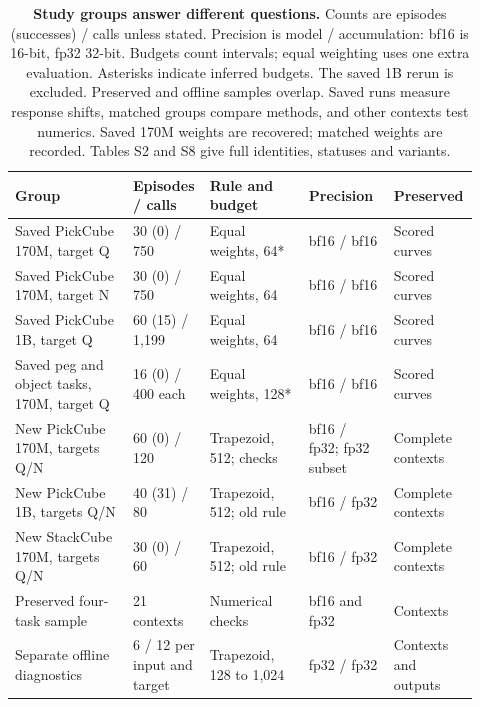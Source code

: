 \begin{table}[htbp]
\centering
\caption{\textbf{Study groups answer different questions.} Counts are episodes (successes) / calls unless stated. Precision is model / accumulation: bf16 is 16-bit, fp32 32-bit. Budgets count intervals; equal weighting uses one extra evaluation. Asterisks indicate inferred budgets. The saved 1B rerun is excluded. Preserved and offline samples overlap. Saved runs measure response shifts, matched groups compare methods, and other contexts test numerics. Saved 170M weights are recovered; matched weights are recorded. Tables S2 and S8 give full identities, statuses and variants.}
\label{tab:r1-experiments}
\setlength{\tabcolsep}{3pt}
\begin{tabular}{p{0.250\linewidth} p{0.140\linewidth} p{0.210\linewidth} p{0.180\linewidth} p{0.140\linewidth}}
\toprule
\textbf{Group} & \textbf{Episodes / calls} & \textbf{Rule and budget} & \textbf{Precision} & \textbf{Preserved} \\
\midrule
Saved PickCube 170M, target Q & 30 (0) / 750 & Equal weights, 64* & bf16 / bf16 & Scored curves \\
Saved PickCube 170M, target N & 30 (0) / 750 & Equal weights, 64 & bf16 / bf16 & Scored curves \\
Saved PickCube 1B, target Q & 60 (15) / 1,199 & Equal weights, 64 & bf16 / bf16 & Scored curves \\
Saved peg and object tasks, 170M, target Q & 16 (0) / 400 each & Equal weights, 128* & bf16 / bf16 & Scored curves \\
New PickCube 170M, targets Q/N & 60 (0) / 120 & Trapezoid, 512; checks & bf16 / fp32; fp32 subset & Complete contexts \\
New PickCube 1B, targets Q/N & 40 (31) / 80 & Trapezoid, 512; old rule & bf16 / fp32 & Complete contexts \\
New StackCube 170M, targets Q/N & 30 (0) / 60 & Trapezoid, 512; old rule & bf16 / fp32 & Complete contexts \\
Preserved four-task sample & 21 contexts & Numerical checks & bf16 and fp32 & Contexts \\
Separate offline diagnostics & 6 / 12 per input and target & Trapezoid, 128 to 1,024 & fp32 / fp32 & Contexts and outputs \\
\bottomrule
\end{tabular}
\end{table}
